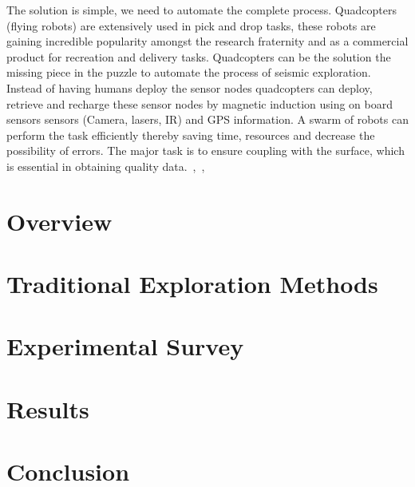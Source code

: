 \documentclass[conference]{IEEEtran}
\begin{document}
The solution is simple, we need to automate the complete process. Quadcopters (flying robots) are extensively used in pick and drop tasks, these robots are gaining incredible popularity amongst the research fraternity and as a commercial product for recreation and delivery tasks. Quadcopters can be the solution the missing piece in the puzzle to automate the process of seismic exploration. Instead of having humans deploy the sensor nodes quadcopters can deploy, retrieve and recharge these sensor nodes by magnetic induction using on board sensors sensors (Camera, lasers, IR) and GPS information. A swarm of robots can perform the task efficiently thereby saving time, resources and decrease the possibility of errors. The major task is to ensure coupling with the surface, which is essential in obtaining quality data.~\cite{MVEwaWSN05},~\cite{CtMiSD08},~\cite{DSSMaA14} 


\section{Overview}


\section{Traditional Exploration Methods}
 


\section{Experimental Survey}



\section{Results}



\section{Conclusion}




\end{document}
